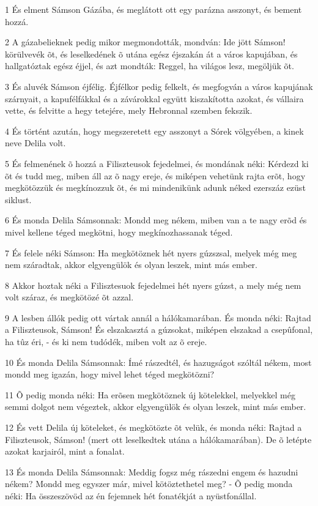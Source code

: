 \par 1 És elment Sámson Gázába, és meglátott ott egy parázna asszonyt, és bement hozzá.
\par 2 A gázabelieknek pedig mikor megmondották, mondván: Ide jött Sámson! körülvevék õt, és leselkedének õ utána egész éjszakán át a város kapujában, és hallgatóztak egész éjjel, és azt mondták: Reggel, ha világos lesz, megöljük õt.
\par 3 És aluvék Sámson éjfélig. Éjfélkor pedig felkelt, és megfogván a város kapujának szárnyait, a kapufélfákkal és a závárokkal együtt kiszakította azokat, és vállaira vette, és felvitte a hegy tetejére, mely Hebronnal szemben fekszik.
\par 4 És történt azután, hogy megszeretett egy asszonyt a Sórek völgyében, a kinek neve Delila volt.
\par 5 És felmenének õ hozzá a Filiszteusok fejedelmei, és mondának néki: Kérdezd ki õt és tudd meg, miben áll az õ nagy ereje, és miképen vehetünk rajta erõt, hogy megkötözzük és megkínozzuk õt, és mi mindenikünk adunk néked ezerszáz ezüst siklust.
\par 6 És monda Delila Sámsonnak: Mondd meg nékem, miben van a te nagy erõd és mivel kellene téged megkötni, hogy megkínozhassanak téged.
\par 7 És felele néki Sámson: Ha megkötöznek hét nyers gúzszsal, melyek még meg nem száradtak, akkor elgyengülök és olyan leszek, mint más ember.
\par 8 Akkor hoztak néki a Filisztesuok fejedelmei hét nyers gúzst, a mely még nem volt száraz, és megkötözé õt azzal.
\par 9 A lesben állók pedig ott vártak annál a hálókamarában. És monda néki: Rajtad a Filiszteusok, Sámson! És elszakasztá a gúzsokat, miképen elszakad a csepûfonal, ha tûz éri, - és ki nem tudódék, miben volt az õ ereje.
\par 10 És monda Delila Sámsonnak: Ímé rászedtél, és hazugságot szóltál nékem, most mondd meg igazán, hogy mivel lehet téged megkötözni?
\par 11 Õ pedig monda néki: Ha erõsen megkötöznek új kötelekkel, melyekkel még semmi dolgot nem végeztek, akkor elgyengülök és olyan leszek, mint más ember.
\par 12 És vett Delila új köteleket, és megkötözte õt velük, és monda néki: Rajtad a Filiszteusok, Sámson! (mert ott leselkedtek utána a hálókamarában). De õ letépte azokat karjairól, mint a fonalat.
\par 13 És monda Delila Sámsonnak: Meddig fogsz még rászedni engem és hazudni nékem? Mondd meg egyszer már, mivel kötöztethetel meg? - Õ pedig monda néki: Ha összeszövöd az én fejemnek hét fonatékját a nyüstfonállal.
